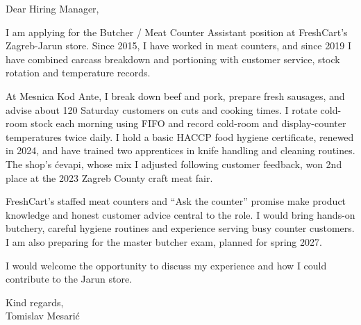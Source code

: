 \documentclass[11pt,a4paper]{article}
\begin{document}
\color{primarycolor}
Dear Hiring Manager,

I am applying for the Butcher / Meat Counter Assistant position at FreshCart's Zagreb-Jarun store. Since 2015, I have worked in meat counters, and since 2019 I have combined carcass breakdown and portioning with customer service, stock rotation and temperature records.

At Mesnica Kod Ante, I break down beef and pork, prepare fresh sausages, and advise about 120 Saturday customers on cuts and cooking times. I rotate cold-room stock each morning using FIFO and record cold-room and display-counter temperatures twice daily. I hold a basic HACCP food hygiene certificate, renewed in 2024, and have trained two apprentices in knife handling and cleaning routines. The shop's ćevapi, whose mix I adjusted following customer feedback, won 2nd place at the 2023 Zagreb County craft meat fair.

FreshCart's staffed meat counters and “Ask the counter” promise make product knowledge and honest customer advice central to the role. I would bring hands-on butchery, careful hygiene routines and experience serving busy counter customers. I am also preparing for the master butcher exam, planned for spring 2027.

I would welcome the opportunity to discuss my experience and how I could contribute to the Jarun store.

Kind regards,\\
Tomislav Mesarić
\end{document}
